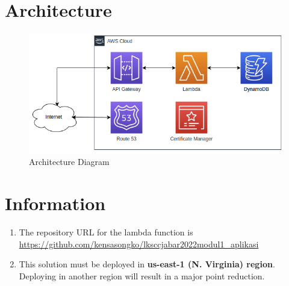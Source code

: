 \documentclass{article}
\begin{document}
\section{Architecture}
\begin{figure}[h]
\centering
\includegraphics[width=\textwidth]{modul1_architecture.png}
\caption{\label{fig:architecture}Architecture Diagram}
\end{figure}

\section{Information}

\begin{enumerate}
  \item The repository URL for the lambda function is \href{https://github.com/kensasongko/lksccjabar2022modul1_aplikasi}{https://github.com/kensasongko/lksccjabar2022modul1\_aplikasi}
  \item This solution must be deployed in \textbf{us-east-1 (N. Virginia) region}. Deploying in another region will result in a major point reduction.
\end{enumerate}
\end{document}
